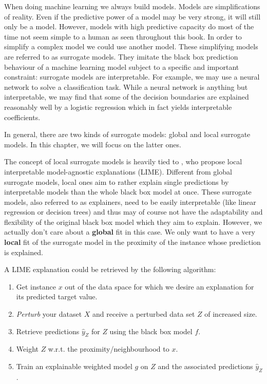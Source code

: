 \documentclass[
]{krantz}
\begin{document}
When doing machine learning we always build models.
Models are simplifications of reality.
Even if the predictive power of a model may be very strong, it will still only be a model.
However, models with high predictive capacity do most of the time not seem simple to a human as seen throughout this book.
In order to simplify a complex model we could use another model.
These simplifying models are referred to as surrogate models.
They imitate the black box prediction behaviour of a machine learning model subject to a specific and important constraint:
surrogate models are interpretable.
For example, we may use a neural network to solve a classification task.
While a neural network is anything but interpretable, we may find that some of the decision boundaries are explained reasonably well by a logistic regression which in fact yields interpretable coefficients.

In general, there are two kinds of surrogate models: global and local surrogate models.
In this chapter, we will focus on the latter ones.

The concept of local surrogate models is heavily tied to \citet{ribeiro2016should}, who propose local interpretable model-agnostic explanations (LIME).
Different from global surrogate models, local ones aim to rather explain single predictions by interpretable models than the whole black box model at once.
These surrogate models, also referred to as explainers, need to be easily interpretable (like linear regression or decision trees) and thus may of course not have the adaptability and flexibility of the original black box model which they aim to explain.
However, we actually don't care about a \textbf{global} fit in this case.
We only want to have a very \textbf{local} fit of the surrogate model in the proximity of the instance whose prediction is explained.

A LIME explanation could be retrieved by the following algorithm:

\begin{enumerate}
\def\labelenumi{\arabic{enumi}.}
\item
  Get instance \(x\) out of the data space for which we desire an explanation for its predicted target value.
\item
  \emph{Perturb} your dataset \(X\) and receive a perturbed data set \(Z\) of increased size.
\item
  Retrieve predictions \(\hat{y}_{Z}\) for \(Z\) using the black box model \(f\).
\item
  Weight \(Z\) w.r.t. the proximity/neighbourhood to \(x\).
\item
  Train an explainable weighted model \(g\) on \(Z\) and the associated predictions \(\hat{y}_{Z}\).
\end{enumerate}
\end{document}
